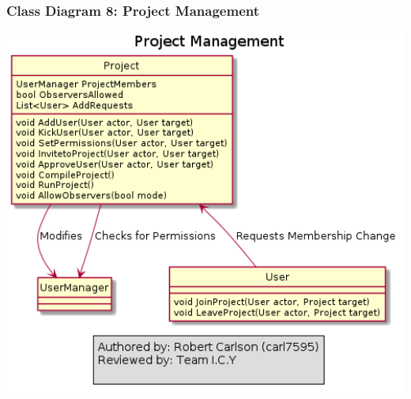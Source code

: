 \documentclass[twoside,letterpaper]{article}
\begin{document}
	\newpage
	
	\subsubsection[Class Diagram 8: Project Management]{\rmfamily\bfseries\color{black}
		Class Diagram 8: Project Management}
	\hypertarget{RefHeading22059017292}{}
	\bigskip
	
	\includegraphics[width=6.0in]{images/ClassDiagrams/ProjectManagement}
	
\end{document}
